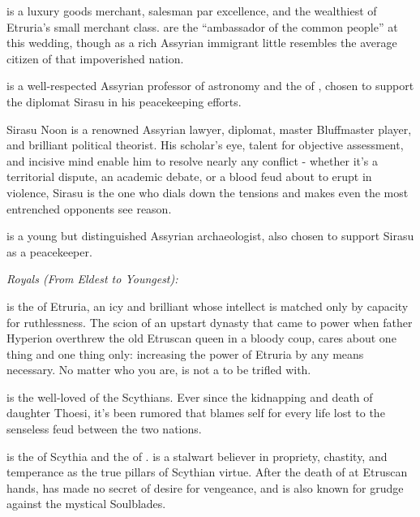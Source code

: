 \documentclass[blue]{Kos}
\begin{document}
\cMerchant{} is a luxury goods merchant, salesman par excellence, and the wealthiest of Etruria's small merchant class. \cMerchant{\They} are the ``ambassador of the common people'' at this wedding, though as a rich Assyrian immigrant \cMerchant{\they} little resembles the average citizen of that impoverished nation. 

\cAnarchist{} is a well-respected Assyrian professor of astronomy and the \cAnarchist{\sibling} of \cMerchant{}, chosen to support the diplomat Sirasu in his peacekeeping efforts.

Sirasu Noon is a renowned Assyrian lawyer, diplomat, master Bluffmaster player, and brilliant political theorist. His scholar's eye, talent for objective assessment, and incisive mind enable him to resolve nearly any conflict - whether it’s a territorial dispute, an academic debate, or a blood feud about to erupt in violence, Sirasu is the one who dials down the tensions and makes even the most entrenched opponents see reason.

\cArchaeologist{} is a young but distinguished Assyrian archaeologist, also chosen to support Sirasu as a peacekeeper.

\emph{Royals (From Eldest to Youngest):}

\cEtruriaKing{} is the \cEtruriaKing{\monarch} of Etruria, an icy and brilliant \cEtruriaKing{\human} whose intellect is matched only by \cEtruriaKing{\their} capacity for ruthlessness. The scion of an upstart dynasty that came to power when \cEtruriaKing{\their} father Hyperion overthrew the old Etruscan queen in a bloody coup, \cEtruriaKing{\they} cares about one thing and one thing only: increasing the power of Etruria by any means necessary. No matter who you are, \cEtruriaKing{\they} is not a \cEtruriaKing{\human} to be trifled with.

\cScythiaKing{} is the well-loved \cScythiaKing{\monarch} of the Scythians. Ever since the kidnapping and death of \cScythiaKing{\their} daughter Thoesi, it’s been rumored that \cScythiaKing{\they} blames \cScythiaKing{\them}self for every life lost to the senseless feud between the two nations.

\cScythiaQueen{} is the \cScythiaQueen{\monarch} of Scythia and the \cScythiaQueen{\spouse} of \cScythiaKing{}. \cScythiaQueen{\They} is a stalwart believer in propriety, chastity, and temperance as the true pillars of Scythian virtue. After the death of \cScythiaQueen{\their} \cFugitive{\offspring} at Etruscan hands, \cScythiaQueen{} has made no secret of \cScythiaQueen{\their} desire for vengeance, and is also known for \cScythiaQueen{\their} grudge against the mystical Soulblades.
\end{document}
